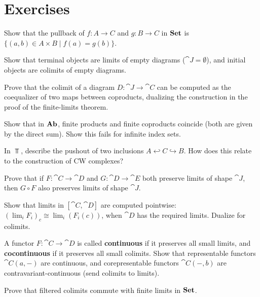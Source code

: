 \section{Exercises}

\begin{exercise}
Show that the pullback of $f: A \to C$ and $g: B \to C$ in $\mathbf{Set}$ is $\{(a,b) \in A \times B \mid f(a) = g(b)\}$.
\end{exercise}

\begin{exercise}
Show that terminal objects are limits of empty diagrams ($\cat{J} = \emptyset$), and initial objects are colimits of empty diagrams.
\end{exercise}

\begin{exercise}
Prove that the colimit of a diagram $D: \cat{J} \to \cat{C}$ can be computed as the coequalizer of two maps between coproducts, dualizing the construction in the proof of the finite-limits theorem.
\end{exercise}

\begin{exercise}
Show that in $\mathbf{Ab}$, finite products and finite coproducts coincide (both are given by the direct sum). Show this fails for infinite index sets.
\end{exercise}

\begin{exercise}
In $\Top$, describe the pushout of two inclusions $A \hookleftarrow C \hookrightarrow B$. How does this relate to the construction of CW complexes?
\end{exercise}

\begin{exercise}[$\star$]
Prove that if $F: \cat{C} \to \cat{D}$ and $G: \cat{D} \to \cat{E}$ both preserve limits of shape $\cat{J}$, then $G \circ F$ also preserves limits of shape $\cat{J}$.
\end{exercise}

\begin{exercise}[$\star$]
Show that limits in $[\cat{C}, \cat{D}]$ are computed pointwise: $(\lim_i F_i)_c \cong \lim_i (F_i(c))$, when $\cat{D}$ has the required limits. Dualize for colimits.
\end{exercise}

\begin{exercise}[$\star$]
A functor $F: \cat{C} \to \cat{D}$ is called \textbf{continuous} if it preserves all small limits, and \textbf{cocontinuous} if it preserves all small colimits. Show that representable functors $\cat{C}(a,-)$ are continuous, and corepresentable functors $\cat{C}(-,b)$ are contravariant-continuous (send colimits to limits).
\end{exercise}

\begin{exercise}[$\star\star$]
Prove that filtered colimits commute with finite limits in $\mathbf{Set}$.
\end{exercise}
